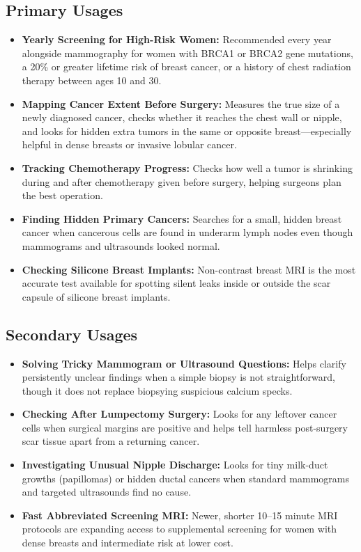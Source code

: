 \subsection{Primary Usages}
\begin{itemize}
\item \textbf{Yearly Screening for High-Risk Women:} Recommended every year alongside mammography for women with BRCA1 or BRCA2 gene mutations, a 20\% or greater lifetime risk of breast cancer, or a history of chest radiation therapy between ages 10 and 30.
\item \textbf{Mapping Cancer Extent Before Surgery:} Measures the true size of a newly diagnosed cancer, checks whether it reaches the chest wall or nipple, and looks for hidden extra tumors in the same or opposite breast---especially helpful in dense breasts or invasive lobular cancer.
\item \textbf{Tracking Chemotherapy Progress:} Checks how well a tumor is shrinking during and after chemotherapy given before surgery, helping surgeons plan the best operation.
\item \textbf{Finding Hidden Primary Cancers:} Searches for a small, hidden breast cancer when cancerous cells are found in underarm lymph nodes even though mammograms and ultrasounds looked normal.
\item \textbf{Checking Silicone Breast Implants:} Non-contrast breast MRI is the most accurate test available for spotting silent leaks inside or outside the scar capsule of silicone breast implants.
\end{itemize}

\subsection{Secondary Usages}
\begin{itemize}
\item \textbf{Solving Tricky Mammogram or Ultrasound Questions:} Helps clarify persistently unclear findings when a simple biopsy is not straightforward, though it does not replace biopsying suspicious calcium specks.
\item \textbf{Checking After Lumpectomy Surgery:} Looks for any leftover cancer cells when surgical margins are positive and helps tell harmless post-surgery scar tissue apart from a returning cancer.
\item \textbf{Investigating Unusual Nipple Discharge:} Looks for tiny milk-duct growths (papillomas) or hidden ductal cancers when standard mammograms and targeted ultrasounds find no cause.
\item \textbf{Fast Abbreviated Screening MRI:} Newer, shorter 10--15 minute MRI protocols are expanding access to supplemental screening for women with dense breasts and intermediate risk at lower cost.
\end{itemize}

